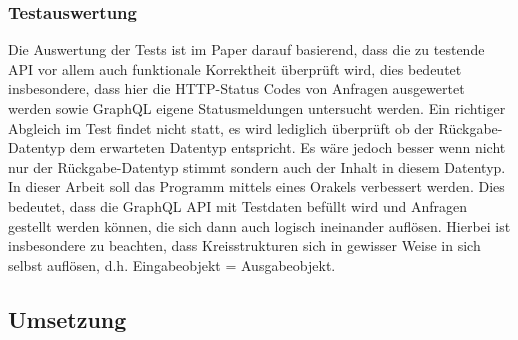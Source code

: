 \subsubsection*{Testauswertung}

Die Auswertung der Tests ist im Paper darauf basierend, dass die zu testende API vor allem auch funktionale Korrektheit überprüft wird,
dies bedeutet insbesondere, dass hier die HTTP-Status Codes von Anfragen ausgewertet werden sowie GraphQL eigene Statusmeldungen untersucht werden.
Ein richtiger Abgleich im Test findet nicht statt, es wird lediglich überprüft ob der Rückgabe-Datentyp dem erwarteten Datentyp entspricht.
Es wäre jedoch besser wenn nicht nur der Rückgabe-Datentyp stimmt sondern auch der Inhalt in diesem Datentyp. In dieser Arbeit
soll das Programm mittels eines Orakels verbessert werden. Dies bedeutet, dass die GraphQL API mit Testdaten befüllt wird und Anfragen
gestellt werden können, die sich dann auch logisch ineinander auflösen. Hierbei ist insbesondere zu beachten, dass Kreisstrukturen sich in gewisser Weise
in sich selbst auflösen, d.h. Eingabeobjekt = Ausgabeobjekt.

\subsection{Umsetzung}

